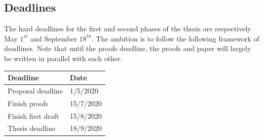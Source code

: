 \documentclass[12pt, final]{article}
\begin{document}

\subsection{Deadlines}

The hard deadlines for the first and second phases of the thesis are respectively May $1^{st}$ and September $18^{th}$. The ambition is to follow the following framework of deadlines. Note that until the proofs deadline, the proofs and paper will largely be written in parallel with each other.


\begin{center}
  \begin{tabular}{ | m{5cm} | m{5cm} | }
    \hline
    Deadline          & Date  \\
    \hline
    Proposal deadline & 1/5/2020 \\
    Finish proofs & 15/7/2020 \\
    Finish first draft & 15/8/2020 \\
    Thesis deadline & 18/9/2020 \\
    \hline
  \end{tabular}
\end{center}

\printbibliography
\makeatother
\end{document}
